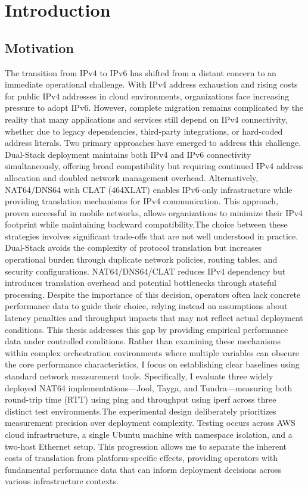 \chapter{Introduction}
\section{Motivation}
The transition from IPv4 to IPv6 has shifted from a distant concern to an immediate operational challenge. With IPv4 address exhaustion and rising costs for public IPv4 addresses in cloud environments, organizations face increasing pressure to adopt IPv6. However, complete migration remains complicated by the reality that many applications and services still depend on IPv4 connectivity, whether due to legacy dependencies, third-party integrations, or hard-coded address literals.
Two primary approaches have emerged to address this challenge. Dual-Stack deployment maintains both IPv4 and IPv6 connectivity simultaneously, offering broad compatibility but requiring continued IPv4 address allocation and doubled network management overhead. Alternatively, NAT64/DNS64 with CLAT (464XLAT) enables IPv6-only infrastructure while providing translation mechanisms for IPv4 communication. This approach, proven successful in mobile networks, allows organizations to minimize their IPv4 footprint while maintaining backward compatibility.The choice between these strategies involves significant trade-offs that are not well understood in practice. Dual-Stack avoids the complexity of protocol translation but increases operational burden through duplicate network policies, routing tables, and security configurations. NAT64/DNS64/CLAT reduces IPv4 dependency but introduces translation overhead and potential bottlenecks through stateful processing. Despite the importance of this decision, operators often lack concrete performance data to guide their choice, relying instead on assumptions about latency penalties and throughput impacts that may not reflect actual deployment conditions.
This thesis addresses this gap by providing empirical performance data under controlled conditions. Rather than examining these mechanisms within complex orchestration environments where multiple variables can obscure the core performance characteristics, I focus on establishing clear baselines using standard network measurement tools. Specifically, I evaluate three widely deployed NAT64 implementations—Jool, Tayga, and Tundra—measuring both round-trip time (RTT) using ping and throughput using iperf across three distinct test environments.The experimental design deliberately prioritizes measurement precision over deployment complexity. Testing occurs across AWS cloud infrastructure, a single Ubuntu machine with namespace isolation, and a two-host Ethernet setup. This progression allows me to separate the inherent costs of translation from platform-specific effects, providing operators with fundamental performance data that can inform deployment decisions across various infrastructure contexts.
